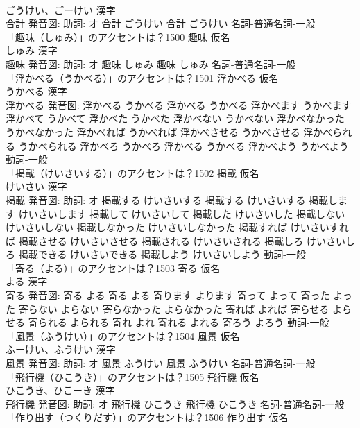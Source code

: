 \documentclass[8pt]{extreport}
\begin{document}
\begin{CJK}{UTF8}{min}
\\	ごうけい、ごーけい 漢字　
\\	合計 発音図: 助詞: オ	合計 ごうけい		合計 ごうけい				名詞-普通名詞-一般 
\\	「趣味（しゅみ）」のアクセントは？1500	趣味 仮名　
\\	しゅみ 漢字　
\\	趣味 発音図: 助詞: オ	趣味 しゅみ		趣味 しゅみ				名詞-普通名詞-一般 
\\	「浮かべる（うかべる）」のアクセントは？1501	浮かべる 仮名　
\\	うかべる 漢字　
\\	浮かべる 発音図:	浮かべる うかべる		浮かべる うかべる 浮かべます うかべます 浮かべて うかべて 浮かべた うかべた 浮かべない うかべない 浮かべなかった うかべなかった 浮かべれば うかべれば 浮かべさせる うかべさせる 浮かべられる うかべられる 浮かべろ うかべろ 浮かべる うかべる 浮かべよう うかべよう				動詞-一般 
\\	「掲載（けいさいする）」のアクセントは？1502	掲載 仮名　
\\	けいさい 漢字　
\\	掲載 発音図: 助詞: オ	掲載する けいさいする		掲載する けいさいする 掲載します けいさいします 掲載して けいさいして 掲載した けいさいした 掲載しない けいさいしない 掲載しなかった けいさいしなかった 掲載すれば けいさいすれば 掲載させる けいさいさせる 掲載される けいさいされる 掲載しろ けいさいしろ 掲載できる けいさいできる 掲載しよう けいさいしよう				動詞-一般 
\\	「寄る（よる）」のアクセントは？1503	寄る 仮名　
\\	よる 漢字　
\\	寄る 発音図:	寄る よる		寄る よる 寄ります よります 寄って よって 寄った よった 寄らない よらない 寄らなかった よらなかった 寄れば よれば 寄らせる よらせる 寄られる よられる 寄れ よれ 寄れる よれる 寄ろう よろう				動詞-一般 
\\	「風景（ふうけい）」のアクセントは？1504	風景 仮名　
\\	ふーけい、ふうけい 漢字　
\\	風景 発音図: 助詞: オ	風景 ふうけい		風景 ふうけい				名詞-普通名詞-一般 
\\	「飛行機（ひこうき）」のアクセントは？1505	飛行機 仮名　
\\	ひこうき、ひこーき 漢字　
\\	飛行機 発音図: 助詞: オ	飛行機 ひこうき		飛行機 ひこうき				名詞-普通名詞-一般 
\\	「作り出す（つくりだす）」のアクセントは？1506	作り出す 仮名　

\end{CJK}
\end{document}

